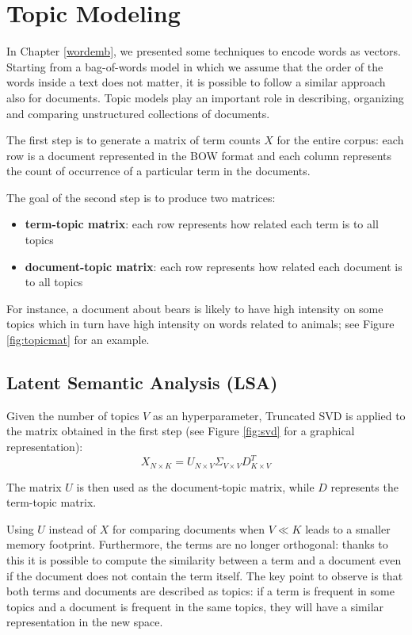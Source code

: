 \chapter{Topic Modeling}

In Chapter \ref{wordemb}, we presented some techniques to encode words as vectors.
Starting from a bag-of-words model in which we assume that the order of the words
inside a text does not matter, it is possible to follow a similar approach also for documents.
Topic models play an important role in describing, organizing and comparing unstructured collections of documents.

The first step is to generate a matrix of term counts $X$ for the entire corpus:
each row is a document represented in the BOW format and each column represents the count of occurrence
of a particular term in the documents.

The goal of the second step is to produce two matrices:
\begin{itemize}
    \item \textbf{term-topic matrix}: each row represents how related each term is to all topics
    \item \textbf{document-topic matrix}: each row represents how related each document is to all topics
\end{itemize}

For instance, a document about bears is likely to have high intensity on some topics which in turn have high
intensity on words related to animals; see Figure \ref{fig:topicmat} for an example.

\section{Latent Semantic Analysis (LSA)}
Given the number of topics $V$ as an hyperparameter,
Truncated SVD is applied to the matrix obtained in the first step
(see Figure \ref{fig:svd} for a graphical representation):
\[X_{N \times K} = U_{N \times V} \Sigma_{V \times V} D_{K \times V}^T\]

The matrix $U$ is then used as the document-topic matrix,
while $D$ represents the term-topic matrix.

Using $U$ instead of $X$ for comparing documents when $V \ll K$ leads to a smaller memory footprint.
Furthermore, the terms are no longer orthogonal: thanks to this it is possible to compute the similarity between
a term and a document even if the document does not contain the term itself.
The key point to observe is that both terms and documents are described as topics: if a term is frequent in some topics and
a document is frequent in the same topics, they will have a similar representation in the new space.

